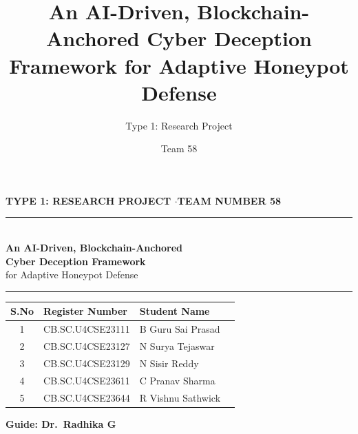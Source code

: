 \documentclass[aspectratio=169,11pt]{beamer}
\title{An AI-Driven, Blockchain-Anchored Cyber Deception Framework for Adaptive Honeypot Defense}
\subtitle{Type 1: Research Project}
\author{Team 58}
\institute{Guide: Dr.\ Radhika G}
\date{}
\begin{document}
{
\begin{frame}[plain]
  \vspace{0.15cm}
  \begin{center}
    {\scriptsize\color{teal}\bfseries TYPE 1: RESEARCH PROJECT \quad$\cdot$\quad TEAM NUMBER 58}\\[6pt]
    {\color{navy}\rule{0.86\textwidth}{1.1pt}}\\[7pt]
    {\Large\color{navy}\bfseries An AI-Driven, Blockchain-Anchored}\\[3pt]
    {\Large\color{navy}\bfseries Cyber Deception Framework}\\[4pt]
    {\normalsize\color{steel} for Adaptive Honeypot Defense}\\[5pt]
    {\color{navy}\rule{0.86\textwidth}{1.1pt}}
  \end{center}
  \vspace{0.10cm}
  \begin{center}
  {\scriptsize
  \begin{tabular}{@{}clll@{}}
    \toprule
    \textbf{S.No} & \textbf{Register Number} & \textbf{Student Name} \\
    \midrule
    1 & CB.SC.U4CSE23111 & B Guru Sai Prasad \\
    2 & CB.SC.U4CSE23127 & N Surya Tejaswar \\
    3 & CB.SC.U4CSE23129 & N Sisir Reddy \\
    4 & CB.SC.U4CSE23611 & C Pranav Sharma \\
    5 & CB.SC.U4CSE23644 & R Vishnu Sathwick \\
    \bottomrule
  \end{tabular}}
  \end{center}
  \vspace{0.15cm}
  \begin{center}{\small\color{navy}\bfseries Guide: Dr.\ Radhika G}\end{center}
\end{frame}}
\end{document}
